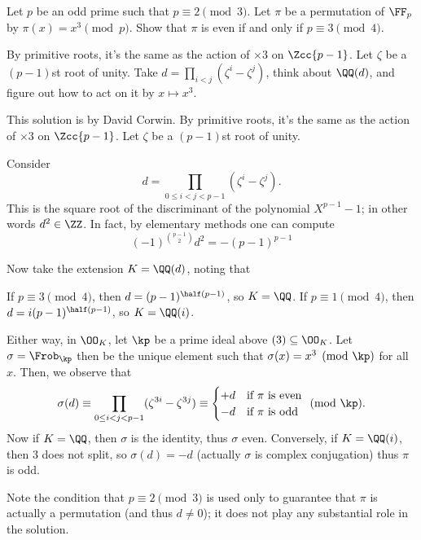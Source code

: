 \begin{problem}
	[Putnam 2012 B6]
	\yod
	Let $p$ be an odd prime such that $p \equiv 2 \pmod 3$.
	Let $\pi$ be a permutation of $\FF_p$ by $\pi(x) = x^3 \pmod p$.
	Show that $\pi$ is even if and only if $p \equiv 3 \pmod 4$.
	\begin{hint}
		By primitive roots, it's the same as the action of $\times 3$ on $\Zcc{p-1}$.
		Let $\zeta$ be a $(p-1)$st root of unity.
		Take $d = \prod_{i < j} (\zeta^i - \zeta^j)$, think about $\QQ(d)$,
		and figure out how to act on it by $x \mapsto x^3$.
	\end{hint}
	\begin{sol}
		This solution is by David Corwin.
		By primitive roots, it's the same as the action of $\times 3$ on $\Zcc{p-1}$.
		Let $\zeta$ be a $(p-1)$st root of unity.

		Consider
		\[ d = \prod_{0 \le i < j < p-1} (\zeta^i - \zeta^j). \]
		This is the square root of the discriminant of
		the polynomial $X^{p-1}-1$; in other words $d^2 \in \ZZ$.
		In fact, by elementary methods one can compute
		\[ (-1)^{\binom{p-1}{2}} d^2 = -(p-1)^{p-1} \]

		Now take the extension $K = \QQ(d)$, noting that
		\begin{itemize}
			\ii If $p \equiv 3 \pmod 4$, then $d = (p-1)^{\half(p-1)}$, so $K = \QQ$.
			\ii If $p \equiv 1 \pmod 4$, then $d = i(p-1)^{\half(p-1)}$, so $K = \QQ(i)$.
		\end{itemize}
		Either way, in $\OO_K$, let $\kp$ be a prime ideal above $(3) \subseteq \OO_K$.
		Let $\sigma = \Frob_\kp$ then be the unique element such that
		$\sigma(x) = x^3 \pmod{\kp}$ for all $x$.
		Then, we observe that
		\[
			\sigma(d) \equiv \prod_{0 \le i < j < p-1} (\zeta^{3i} - \zeta^{3j})
			\equiv \begin{cases}
				+d & \text{if $\pi$ is even} \\
				-d & \text{if $\pi$ is odd}
			\end{cases} \pmod{\kp}.
		\]
		Now if $K = \QQ$, then $\sigma$ is the identity, thus $\sigma$ even.
		Conversely, if $K = \QQ(i)$, then $3$ does not split, so $\sigma(d) = -d$
		(actually $\sigma$ is complex conjugation) thus $\pi$ is odd.

		Note the condition that $p \equiv 2 \pmod 3$ is used only
		to guarantee that $\pi$ is actually a permutation (and thus $d \neq 0$);
		it does not play any substantial role in the solution.
	\end{sol}
\end{problem}
